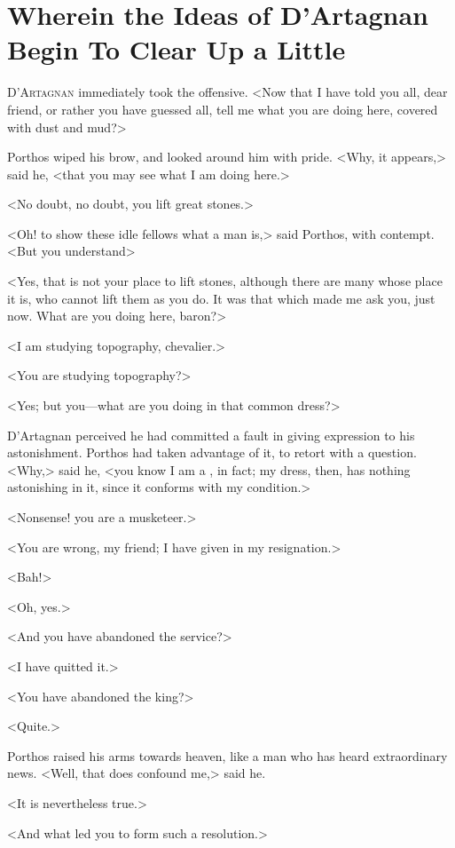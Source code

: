 \chapter{Wherein the Ideas of D'Artagnan Begin To Clear Up a Little}

\lettrine{D}{'Artagnan} immediately took the offensive. <Now that I have told you all, dear friend, or rather you have guessed all, tell me what you are doing here, covered with dust and mud?>

\zz
Porthos wiped his brow, and looked around him with pride. <Why, it appears,> said he, <that you may see what I am doing here.>

<No doubt, no doubt, you lift great stones.>

<Oh! to show these idle fellows what a man is,> said Porthos, with contempt. <But you understand\longdash>

<Yes, that is not your place to lift stones, although there are many whose place it is, who cannot lift them as you do. It was that which made me ask you, just now. What are you doing here, baron?>

<I am studying topography, chevalier.>

<You are studying topography?>

<Yes; but you—what are you doing in that common dress?>

D'Artagnan perceived he had committed a fault in giving expression to his astonishment. Porthos had taken advantage of it, to retort with a question. <Why,> said he, <you know I am a , in fact; my dress, then, has nothing astonishing in it, since it conforms with my condition.>

<Nonsense! you are a musketeer.>

<You are wrong, my friend; I have given in my resignation.>

<Bah!>

<Oh,  yes.>

<And you have abandoned the service?>

<I have quitted it.>

<You have abandoned the king?>

<Quite.>

Porthos raised his arms towards heaven, like a man who has heard extraordinary news. <Well, that does confound me,> said he.

<It is nevertheless true.>

<And what led you to form such a resolution.>

